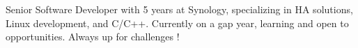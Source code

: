 

\begin{cvparagraph}

Senior Software Developer with 5 years at Synology, specializing in HA solutions, Linux development, and C/C++. Currently on a gap year, learning and open to opportunities. Always up for challenges !
\end{cvparagraph}
